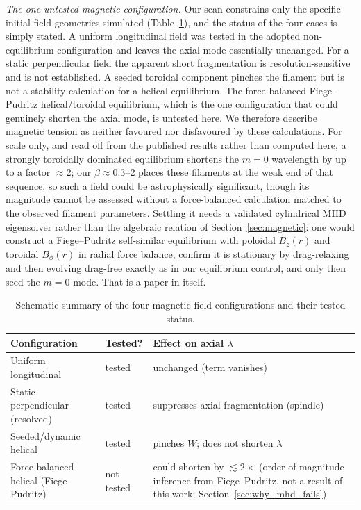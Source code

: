 \documentclass[usenatbib,twoside,twocolumn]{mnras}
\begin{document}
\emph{The one untested magnetic configuration.} Our scan constrains only the specific initial field geometries simulated (Table~\ref{tab:magcases}), and the status of the four cases is simply stated. A uniform longitudinal field was tested in the adopted non-equilibrium configuration and leaves the axial mode essentially unchanged. For a static perpendicular field the apparent short fragmentation is resolution-sensitive and is not established. A seeded toroidal component pinches the filament but is not a stability calculation for a helical equilibrium. The force-balanced Fiege--Pudritz helical/toroidal equilibrium, which is the one configuration that could genuinely shorten the axial mode, is untested here. We therefore describe magnetic tension as neither favoured nor disfavoured by these calculations. For scale only, and read off from the published \citet{Fiege2000} results rather than computed here, a strongly toroidally dominated equilibrium shortens the $m=0$ wavelength by up to a factor $\approx2$; our $\beta\approx0.3$--$2$ places these filaments at the weak end of that sequence, so such a field could be astrophysically significant, though its magnitude cannot be assessed without a force-balanced calculation matched to the observed filament parameters. Settling it needs a validated cylindrical MHD eigensolver rather than the algebraic relation of Section~\ref{sec:magnetic}: one would construct a Fiege--Pudritz self-similar equilibrium with poloidal $B_z(r)$ and toroidal $B_\phi(r)$ in radial force balance, confirm it is stationary by drag-relaxing and then evolving drag-free exactly as in our equilibrium control, and only then seed the $m=0$ mode. That is a paper in itself.

\begin{table}
\caption{Schematic summary of the four magnetic-field configurations and their tested status.}
\label{tab:magcases}
\footnotesize
\setlength{\tabcolsep}{4pt}
\begin{tabular}{@{}p{2.9cm}lp{3.0cm}@{}}
\toprule
Configuration & Tested? & Effect on axial $\lambda$ \\
\midrule
Uniform longitudinal & tested & unchanged (term vanishes) \\
Static perpendicular (resolved) & tested & suppresses axial fragmentation (spindle) \\
Seeded/dynamic helical & tested & pinches $W$; does not shorten $\lambda$ \\
Force-balanced helical (Fiege--Pudritz) & not tested & could shorten by $\lesssim2\times$ (order-of-magnitude inference from Fiege--Pudritz, not a result of this work; Section~\ref{sec:why_mhd_fails}) \\
\bottomrule
\end{tabular}
\end{table}
\end{document}
